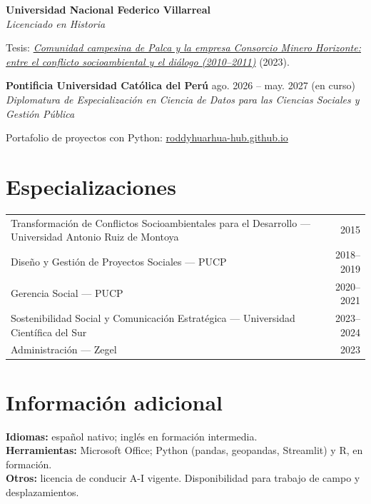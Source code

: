 \documentclass[10pt,a4paper]{article}
\newcommand{\trabajo}[4]{%
  \vspace{5pt}\textbf{#1} \hfill {\small\color{muted}#3}\\
  {\color{teal}\itshape #2}\hfill{\small\color{muted}#4}\par\vspace{1pt}}
\begin{document}
\trabajo{Universidad Nacional Federico Villarreal}{Licenciado en Historia}{}{}
Tesis: \href{https://hdl.handle.net/20.500.13084/6906}{\itshape Comunidad campesina de Palca y la empresa Consorcio Minero Horizonte: entre el conflicto socioambiental y el diálogo (2010–2011)} (2023).

\trabajo{Pontificia Universidad Católica del Perú}{Diplomatura de Especialización en Ciencia de Datos para las Ciencias Sociales y Gestión Pública}{ago. 2026 – may. 2027 (en curso)}{}
Portafolio de proyectos con Python: \href{https://roddyhuarhua-hub.github.io}{roddyhuarhua-hub.github.io}

\section{Especializaciones}
\begin{tabularx}{\linewidth}{@{}X r@{}}
Transformación de Conflictos Socioambientales para el Desarrollo — Universidad Antonio Ruiz de Montoya & {\color{muted}2015}\\
Diseño y Gestión de Proyectos Sociales — PUCP & {\color{muted}2018–2019}\\
Gerencia Social — PUCP & {\color{muted}2020–2021}\\
Sostenibilidad Social y Comunicación Estratégica — Universidad Científica del Sur & {\color{muted}2023–2024}\\
Administración — Zegel & {\color{muted}2023}\\
\end{tabularx}

\section{Información adicional}
\textbf{Idiomas:} español nativo; inglés en formación intermedia.\\
\textbf{Herramientas:} Microsoft Office; Python (pandas, geopandas, Streamlit) y R, en formación.\\
\textbf{Otros:} licencia de conducir A-I vigente. Disponibilidad para trabajo de campo y desplazamientos.
\end{document}
